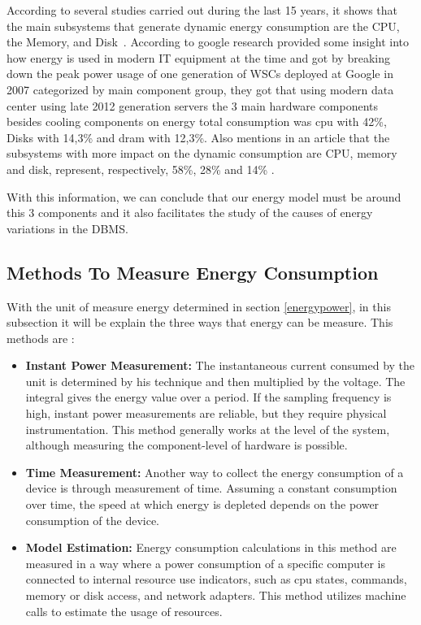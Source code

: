 According to several studies carried out during the last 15 years, it shows that the main subsystems that generate dynamic energy consumption are the CPU, the Memory, and Disk~\cite{portela2016}. According to google research \cite{google} provided some insight into how energy is used in modern IT equipment at the time and got by breaking down the peak power usage of one generation of WSCs deployed at Google in 2007 categorized by main component group, they got that using modern data center using late 2012 generation servers the 3 main hardware components besides cooling components on energy total consumption was \gls{cpu} with 42\%, Disks with 14,3\% and \gls{dram} with 12,3\%. Also \citeauthor{kensal} mentions in an article that the subsystems with more impact on the dynamic consumption are CPU, memory and disk, represent, respectively, 58\%, 28\% and 14\% .

With this information, we can conclude that our energy model must be around this 3 components and it also facilitates the study of the causes of energy variations in the DBMS. 


\subsection{Methods To Measure Energy Consumption}


With the unit of measure energy determined in section \ref{energypower}, in this subsection it will be explain the three ways that energy can be measure. This methods are \cite{ardito2019methodological}:

\begin{itemize}
    \item \textbf{Instant Power Measurement:} The instantaneous current consumed by the unit is determined by his technique and then multiplied by the voltage. The integral gives the energy value over a period. If the sampling frequency is high, instant power measurements are reliable, but they require physical instrumentation. This method generally works at the level of the system, although measuring the component-level of hardware is possible.
    \item \textbf{Time Measurement:} Another way to collect the energy consumption of a device is through measurement of time. Assuming a constant consumption over time, the speed at which energy is depleted depends on the power consumption of the device. 
    \item \textbf{Model Estimation:} Energy consumption calculations in this method are measured in a way where a power consumption of a specific computer is connected to internal resource use indicators, such as \gls{cpu} states, commands, memory or disk access, and network adapters. This method utilizes machine calls to estimate the usage of resources.
\end{itemize}

